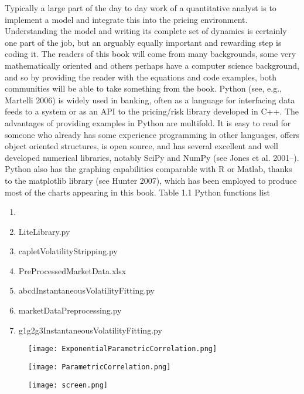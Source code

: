 \documentclass[11pt]{article}
\numberwithin{equation}{subsection}
\begin{document}
\newpage
Typically a large part of the day to day work of a quantitative analyst is to implement a model and integrate this into the pricing environment. Understanding the model and writing its complete set of dynamics is certainly one part of the job, but an arguably equally important and rewarding step is coding it. The readers of this book will come from many backgrounds, some very mathematically oriented and others perhaps have a computer science background, and so by providing the reader with the equations and code examples, both communities will be able to take something from the book. Python (see, e.g., Martelli 2006) is widely used in banking, often as a language for interfacing data feeds to a system or as an API to the pricing/risk library developed in C++. The advantages of providing examples in Python are multifold. It is easy to read for someone who already has some experience programming in other languages, offers object oriented structures, is open source, and has several excellent and well developed numerical libraries, notably SciPy and NumPy (see Jones et al. 2001–). Python also has the graphing capabilities comparable with R or Matlab, thanks to the matplotlib library (see Hunter 2007), which has been employed to produce most of the charts appearing in this book. Table 1.1   Python functions list

\begin{enumerate}
	\item 
	\item LiteLibrary.py
	\item capletVolatilityStripping.py
	\item PreProcessedMarketData.xlsx
	\item abcdInstantaneousVolatilityFitting.py
	\item marketDataPreprocessing.py
	\item g1g2g3InstantaneousVolatilityFitting.py	
\end{enumerate}

\begin{figure}[H]
	\texttt{[image: ExponentialParametricCorrelation.png]}
\end{figure}

\begin{figure}[H]
	\texttt{[image: ParametricCorrelation.png]}
\end{figure}

\begin{figure}[H]
	\texttt{[image: screen.png]}
\end{figure}
\end{document}
